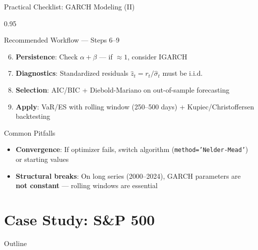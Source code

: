 \documentclass[9pt, aspectratio=169, t]{beamer}
\begin{document}
\begin{frame}{Practical Checklist: GARCH Modeling (II)}
    \begin{cminipage}{0.95\textwidth}
    {\footnotesize
        \begin{block}{Recommended Workflow --- Steps 6--9}
            \begin{enumerate}\setcounter{enumi}{5}\setlength{\itemsep}{1pt}
                \item \textbf{Persistence}: Check $\alpha + \beta$ --- if $\approx 1$, consider IGARCH
                \item \textbf{Diagnostics}: Standardized residuals $\hat{z}_t = r_t / \hat{\sigma}_t$ must be i.i.d.
                \item \textbf{Selection}: AIC/BIC + Diebold-Mariano on out-of-sample forecasting
                \item \textbf{Apply}: VaR/ES with rolling window (250--500 days) + Kupiec/Christoffersen backtesting
            \end{enumerate}
        \end{block}
        \vspace{0.1cm}
        \begin{alertblock}{Common Pitfalls}
            \begin{itemize}\setlength{\itemsep}{0pt}
                \item \textbf{Convergence}: If optimizer fails, switch algorithm (\texttt{method='Nelder-Mead'}) or starting values
                \item \textbf{Structural breaks}: On long series (2000--2024), GARCH parameters are \textbf{not constant} --- rolling windows are essential
            \end{itemize}
        \end{alertblock}
    }
    \end{cminipage}
\end{frame}

\section{Case Study: S\&P 500}

\begin{frame}{Outline}
    \small
    \vspace{-0.2cm}
    \tableofcontents[currentsection]
\end{frame}
\end{document}
